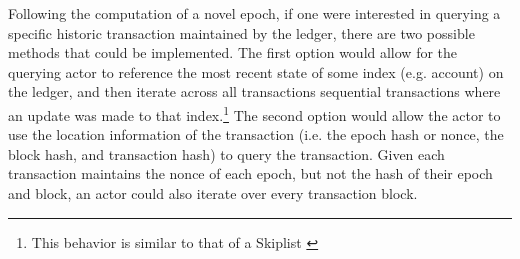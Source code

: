 
Following the computation of a novel epoch, if one were interested in querying a specific historic transaction maintained by the ledger, there are two possible methods that could be implemented. The first option would allow for the querying actor to reference the most recent state of some index (e.g. account) on the ledger, and then iterate across all transactions sequential transactions where an update was made to that index.\footnote{This behavior is similar to that of a Skiplist \cite{Pugh1990-yz}} The second option would allow the actor to use the location information of the transaction (i.e. the epoch hash or nonce, the block hash, and transaction hash) to query the transaction. Given each transaction maintains the nonce of each epoch, but not the hash of their epoch and block, an actor could also iterate over every transaction block.
